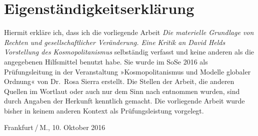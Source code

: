 \endgroup
\newpage

\section*{Eigenständigkeitserklärung}\label{eigenstuxe4ndigkeitserkluxe4rung}

Hiermit erkläre ich, dass ich die vorliegende Arbeit \emph{Die
materielle Grundlage von Rechten und gesellschaftlicher Veränderung.
Eine Kritik an David Helds Vorstellung des Kosmopolitanismus}
selbständig verfasst und keine anderen als die angegebenen Hilfsmittel
benutzt habe. Sie wurde im SoSe 2016 als Prüfungsleitung in der
Veranstaltung »Kosmopolitanismus und Modelle globaler Ordnung« von
Dr.~Rosa Sierra erstellt. Die Stellen der Arbeit, die anderen Quellen im
Wortlaut oder auch nur dem Sinn nach entnommen wurden, sind durch
Angaben der Herkunft kenntlich gemacht. Die vorliegende Arbeit wurde
bisher in keinem anderen Kontext als Prüfungsleistung vorgelegt.
\vspace{3em}

\noindent Frankfurt / M., 10. Oktober 2016
